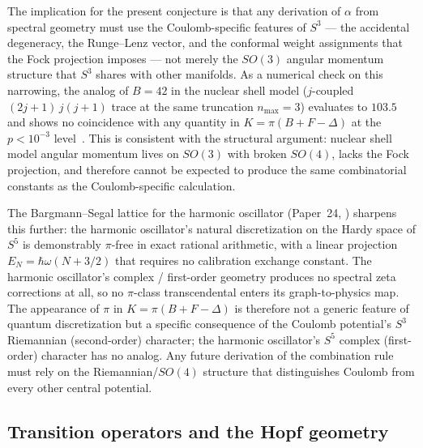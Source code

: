 \documentclass[aps,prl,twocolumn,superscriptaddress]{revtex4-2}
\begin{document}
The implication for the present conjecture is that any derivation of
$\alpha$ from spectral geometry must use the Coulomb-specific
features of $S^3$ --- the accidental degeneracy, the Runge--Lenz
vector, and the conformal weight assignments that the Fock projection
imposes --- not merely the $SO(3)$ angular momentum structure that
$S^3$ shares with other manifolds. As a numerical check on this
narrowing, the analog of $B = 42$ in the nuclear shell model
($j$-coupled $(2j+1)\,j(j+1)$ trace at the same truncation
$n_{\max} = 3$) evaluates to $103.5$ and shows no coincidence with
any quantity in $K = \pi(B + F - \Delta)$ at the $p < 10^{-3}$
level~\cite{track_nj_alpha_memo}. This is consistent with the
structural argument: nuclear shell model angular momentum lives on
$SO(3)$ with broken $SO(4)$, lacks the Fock projection, and
therefore cannot be expected to produce the same combinatorial
constants as the Coulomb-specific calculation.

The Bargmann--Segal lattice for the harmonic oscillator (Paper~24,
\cite{paper24_bargmann}) sharpens this further: the harmonic
oscillator's natural discretization on the Hardy space of $S^5$ is
demonstrably $\pi$-free in exact rational arithmetic, with a linear
projection $E_N = \hbar\omega(N + 3/2)$ that requires no calibration
exchange constant. The harmonic oscillator's complex / first-order
geometry produces no spectral zeta corrections at all, so no
$\pi$-class transcendental enters its graph-to-physics map. The
appearance of $\pi$ in $K = \pi(B + F - \Delta)$ is therefore not a
generic feature of quantum discretization but a specific consequence
of the Coulomb potential's $S^3$ Riemannian (second-order) character;
the harmonic oscillator's $S^5$ complex (first-order) character has
no analog. Any future derivation of the combination rule must rely on
the Riemannian/$SO(4)$ structure that distinguishes Coulomb from
every other central potential.


\subsection{Transition operators and the Hopf geometry}
\end{document}
